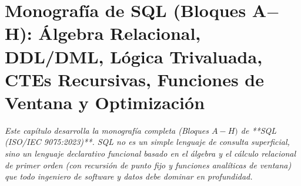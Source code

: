 \documentclass{book}
\begin{document}
\chapter{Monografía de SQL (Bloques A\(-\)H): Álgebra Relacional, DDL/DML, Lógica Trivaluada, CTEs Recursivas, Funciones de Ventana y Optimización}
\label{chap:cap01-monografia-sql-ddl-dml-cte-ventanas-optimizacion}

\noindent\textit{Este capítulo desarrolla la monografía completa (Bloques \(A-H)\) de **SQL (ISO/IEC 9075:2023)**. SQL no es un simple lenguaje de consulta superficial, sino un lenguaje declarativo funcional basado en el álgebra y el cálculo relacional de primer orden (con recursión de punto fijo y funciones analíticas de ventana) que todo ingeniero de software y datos debe dominar en profundidad.}
\end{document}
